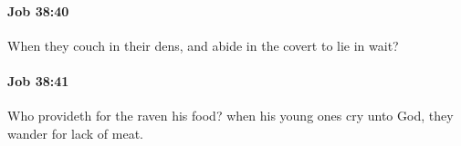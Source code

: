 		\paragraph{Job 38:40} %
			\label{JOB-38-40}

			When they couch in their dens, and abide in the covert to lie in wait?


		\paragraph{Job 38:41} %
			\label{JOB-38-41}

			Who provideth for the raven his food? when his young ones cry unto God, they wander for lack of meat.

